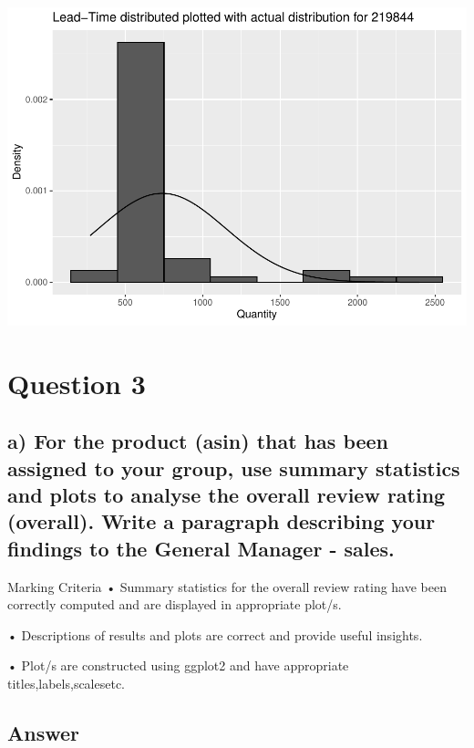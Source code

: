 \documentclass[
  11pt,
]{article}
\begin{document}
\includegraphics{Assignment-STAT702_files/figure-latex/2bii plot-1.pdf}

\hypertarget{question-3}{%
\section{Question 3}\label{question-3}}

\hypertarget{a-for-the-product-asin-that-has-been-assigned-to-your-group-use-summary-statistics-and-plots-to-analyse-the-overall-review-rating-overall.-write-a-paragraph-describing-your-findings-to-the-general-manager---sales.}{%
\subsection{a) For the product (asin) that has been assigned to your
group, use summary statistics and plots to analyse the overall review
rating (overall). Write a paragraph describing your findings to the
General Manager -
sales.}\label{a-for-the-product-asin-that-has-been-assigned-to-your-group-use-summary-statistics-and-plots-to-analyse-the-overall-review-rating-overall.-write-a-paragraph-describing-your-findings-to-the-general-manager---sales.}}

Marking Criteria • Summary statistics for the overall review rating have
been correctly computed and are displayed in appropriate plot/s.

• Descriptions of results and plots are correct and provide useful
insights.

• Plot/s are constructed using ggplot2 and have appropriate
titles,labels,scalesetc.

\hypertarget{answer-2}{%
\subsection{Answer}\label{answer-2}}
\end{document}

